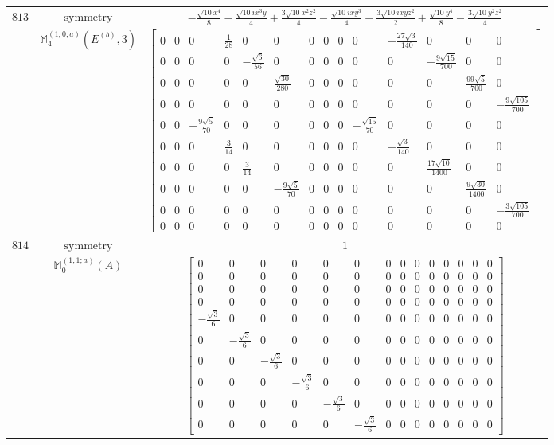\documentclass[fleqn,8pt,landscape]{jsarticle}
\begin{document}
\begin{longtable}{ccc}
$ 813 $ & $ \text{symmetry} $ & $ - \frac{\sqrt{10} x^{4}}{8} - \frac{\sqrt{10} i x^{3} y}{4} + \frac{3 \sqrt{10} x^{2} z^{2}}{4} - \frac{\sqrt{10} i x y^{3}}{4} + \frac{3 \sqrt{10} i x y z^{2}}{2} + \frac{\sqrt{10} y^{4}}{8} - \frac{3 \sqrt{10} y^{2} z^{2}}{4} $ \\
$  $ & $ \mathbb{M}_{4}^{(1,0;a)}(E^{(b)},3) $ & $ \begin{bmatrix} 0 & 0 & 0 & \frac{1}{28} & 0 & 0 & 0 & 0 & 0 & 0 & - \frac{27 \sqrt{3}}{140} & 0 & 0 & 0 \\ 0 & 0 & 0 & 0 & - \frac{\sqrt{6}}{56} & 0 & 0 & 0 & 0 & 0 & 0 & - \frac{9 \sqrt{15}}{700} & 0 & 0 \\ 0 & 0 & 0 & 0 & 0 & \frac{\sqrt{30}}{280} & 0 & 0 & 0 & 0 & 0 & 0 & \frac{99 \sqrt{5}}{700} & 0 \\ 0 & 0 & 0 & 0 & 0 & 0 & 0 & 0 & 0 & 0 & 0 & 0 & 0 & - \frac{9 \sqrt{105}}{700} \\ 0 & 0 & - \frac{9 \sqrt{5}}{70} & 0 & 0 & 0 & 0 & 0 & 0 & - \frac{\sqrt{15}}{70} & 0 & 0 & 0 & 0 \\ 0 & 0 & 0 & \frac{3}{14} & 0 & 0 & 0 & 0 & 0 & 0 & - \frac{\sqrt{3}}{140} & 0 & 0 & 0 \\ 0 & 0 & 0 & 0 & \frac{3}{14} & 0 & 0 & 0 & 0 & 0 & 0 & \frac{17 \sqrt{10}}{1400} & 0 & 0 \\ 0 & 0 & 0 & 0 & 0 & - \frac{9 \sqrt{5}}{70} & 0 & 0 & 0 & 0 & 0 & 0 & \frac{9 \sqrt{30}}{1400} & 0 \\ 0 & 0 & 0 & 0 & 0 & 0 & 0 & 0 & 0 & 0 & 0 & 0 & 0 & - \frac{3 \sqrt{105}}{700} \\ 0 & 0 & 0 & 0 & 0 & 0 & 0 & 0 & 0 & 0 & 0 & 0 & 0 & 0 \end{bmatrix} $ \\ \hline
$ 814 $ & $ \text{symmetry} $ & $ 1 $ \\
$  $ & $ \mathbb{M}_{0}^{(1,1;a)}(A) $ & $ \begin{bmatrix} 0 & 0 & 0 & 0 & 0 & 0 & 0 & 0 & 0 & 0 & 0 & 0 & 0 & 0 \\ 0 & 0 & 0 & 0 & 0 & 0 & 0 & 0 & 0 & 0 & 0 & 0 & 0 & 0 \\ 0 & 0 & 0 & 0 & 0 & 0 & 0 & 0 & 0 & 0 & 0 & 0 & 0 & 0 \\ 0 & 0 & 0 & 0 & 0 & 0 & 0 & 0 & 0 & 0 & 0 & 0 & 0 & 0 \\ - \frac{\sqrt{3}}{6} & 0 & 0 & 0 & 0 & 0 & 0 & 0 & 0 & 0 & 0 & 0 & 0 & 0 \\ 0 & - \frac{\sqrt{3}}{6} & 0 & 0 & 0 & 0 & 0 & 0 & 0 & 0 & 0 & 0 & 0 & 0 \\ 0 & 0 & - \frac{\sqrt{3}}{6} & 0 & 0 & 0 & 0 & 0 & 0 & 0 & 0 & 0 & 0 & 0 \\ 0 & 0 & 0 & - \frac{\sqrt{3}}{6} & 0 & 0 & 0 & 0 & 0 & 0 & 0 & 0 & 0 & 0 \\ 0 & 0 & 0 & 0 & - \frac{\sqrt{3}}{6} & 0 & 0 & 0 & 0 & 0 & 0 & 0 & 0 & 0 \\ 0 & 0 & 0 & 0 & 0 & - \frac{\sqrt{3}}{6} & 0 & 0 & 0 & 0 & 0 & 0 & 0 & 0 \end{bmatrix} $ \\ \hline

\end{longtable}
\end{document}
